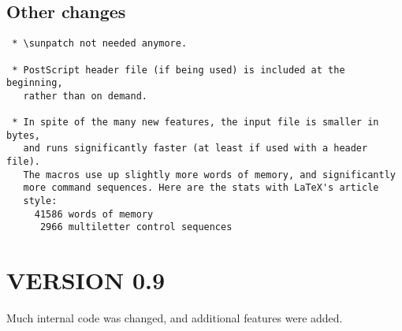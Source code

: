 \subsection{Other changes}

\begin{Verbatim}
 * \sunpatch not needed anymore.

 * PostScript header file (if being used) is included at the beginning,
   rather than on demand.

 * In spite of the many new features, the input file is smaller in bytes,
   and runs significantly faster (at least if used with a header file).
   The macros use up slightly more words of memory, and significantly
   more command sequences. Here are the stats with LaTeX's article
   style:
     41586 words of memory
      2966 multiletter control sequences
\end{Verbatim}

\section{VERSION 0.9}

Much internal code was changed, and additional features were added.


